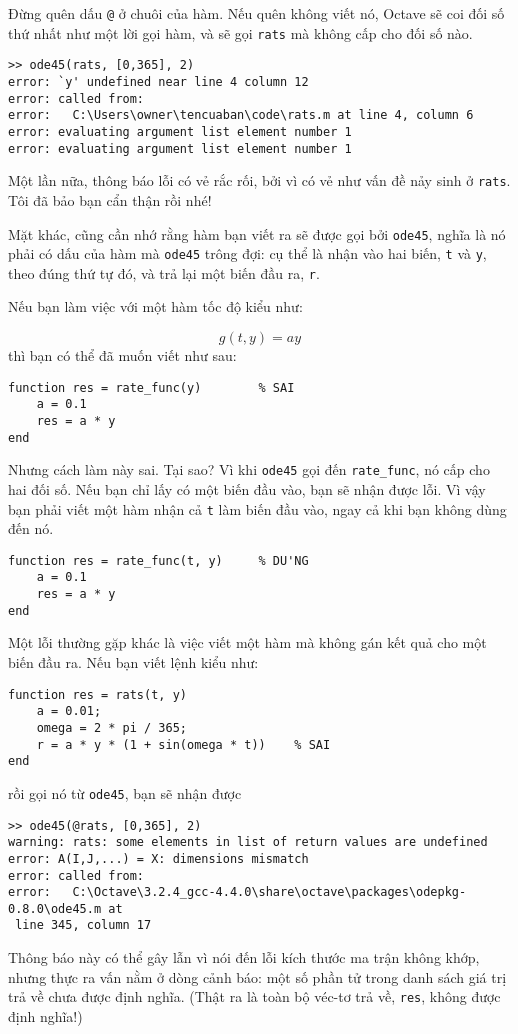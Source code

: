 \documentclass[12pt]{book}
\begin{document}
Đừng quên dấu {\tt @} ở chuôi của hàm. Nếu quên không viết nó,
Octave sẽ coi đối số thứ nhất như một lời gọi hàm, và sẽ gọi
{\tt rats} mà không cấp cho đối số nào.

\begin{verbatim}
>> ode45(rats, [0,365], 2)
error: `y' undefined near line 4 column 12
error: called from:
error:   C:\Users\owner\tencuaban\code\rats.m at line 4, column 6
error: evaluating argument list element number 1
error: evaluating argument list element number 1
\end{verbatim}
%
Một lần nữa, thông báo lỗi có vẻ rắc rối, bởi vì có vẻ như vấn đề
nảy sinh ở {\tt rats}.  Tôi đã bảo bạn cẩn thận rồi nhé!

Mặt khác, cũng cần nhớ rằng hàm bạn viết ra sẽ được gọi bởi
{\tt ode45}, nghĩa là nó phải có dấu của hàm mà {\tt ode45}
trông đợi: cụ thể là nhận vào hai biến, {\tt t} và {\tt y},
theo đúng thứ tự đó, và trả lại một biến đầu ra, {\tt r}.

Nếu bạn làm việc với một hàm tốc độ kiểu như:

\[ g(t, y) = a y \]
%
thì bạn có thể đã muốn viết như sau:

\begin{verbatim}
function res = rate_func(y)        % SAI
    a = 0.1
    res = a * y
end
\end{verbatim}
%
Nhưng cách làm này sai. Tại sao? Vì khi {\tt ode45} gọi đến
\verb#rate_func#, nó cấp cho hai đối số. Nếu bạn chỉ lấy có
một biến đầu vào, bạn sẽ nhận được lỗi. Vì vậy bạn phải viết
một hàm nhận cả {\tt t} làm biến đầu vào, ngay cả khi bạn
không dùng đến nó.

\begin{verbatim}
function res = rate_func(t, y)     % DU'NG
    a = 0.1
    res = a * y
end
\end{verbatim}

Một lỗi thường gặp khác là việc viết một hàm mà không gán
kết quả cho một biến đầu ra. Nếu bạn viết lệnh kiểu như:

\begin{verbatim}
function res = rats(t, y)
    a = 0.01;
    omega = 2 * pi / 365;
    r = a * y * (1 + sin(omega * t))    % SAI
end
\end{verbatim}
%
rồi gọi nó từ {\tt ode45}, bạn sẽ nhận được

\begin{verbatim}
>> ode45(@rats, [0,365], 2)
warning: rats: some elements in list of return values are undefined
error: A(I,J,...) = X: dimensions mismatch
error: called from:
error:   C:\Octave\3.2.4_gcc-4.4.0\share\octave\packages\odepkg-0.8.0\ode45.m at
 line 345, column 17
\end{verbatim}
%
Thông báo này có thể gây lẫn vì nói đến lỗi kích thước ma trận không
khớp, nhưng thực ra vấn nằm ở dòng cảnh báo: một số phần tử trong
danh sách giá trị trả về chưa được định nghĩa. (Thật ra là toàn bộ 
véc-tơ trả về, \texttt{res}, không được định nghĩa!)
\end{document}
